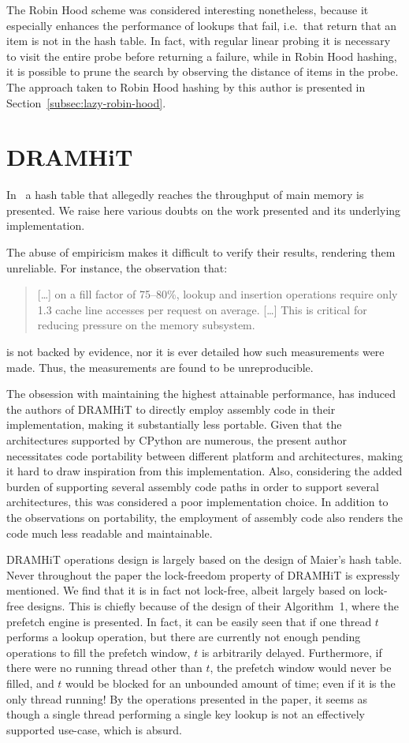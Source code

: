 The Robin Hood scheme was considered interesting nonetheless, because it especially enhances the performance of lookups that fail, i.e.\ that return that an item is not in the hash table.
In fact, with regular linear probing it is necessary to visit the entire probe before returning a failure, while in Robin Hood hashing, it is possible to prune the search by observing the distance of items in the probe.
The approach taken to Robin Hood hashing by this author is presented in Section~\ref{subsec:lazy-robin-hood}.


\section{DRAMHiT}\label{sec:dramhit}

In~\cite{dramhit} a hash table that allegedly reaches the throughput of main memory is presented.
We raise here various doubts on the work presented and its underlying implementation.

The abuse of empiricism makes it difficult to verify their results, rendering them unreliable.
For instance, the observation that:
\begin{quote}
	[\ldots] on a fill factor of 75--80\%, lookup and insertion operations require only 1.3 cache line accesses per request on average.
	[\ldots] This is critical for reducing pressure on the memory subsystem.
\end{quote}
is not backed by evidence, nor it is ever detailed how such measurements were made.
Thus, the measurements are found to be unreproducible.

The obsession with maintaining the highest attainable performance, has induced the authors of DRAMHiT to directly employ assembly code in their implementation, making it substantially less portable.
Given that the architectures supported by CPython are numerous, the present author necessitates code portability between different platform and architectures, making it hard to draw inspiration from this implementation.
Also, considering the added burden of supporting several assembly code paths in order to support several architectures, this was considered a poor implementation choice.
In addition to the observations on portability, the employment of assembly code also renders the code much less readable and maintainable.

DRAMHiT operations design is largely based on the design of Maier's hash table.
Never throughout the paper the lock-freedom property of DRAMHiT is expressly mentioned.
We find that it is in fact not lock-free, albeit largely based on lock-free designs.
This is chiefly because of the design of their Algorithm~1, where the prefetch engine is presented.
In fact, it can be easily seen that if one thread $t$ performs a lookup operation, but there are currently not enough pending operations to fill the prefetch window, $t$ is arbitrarily delayed.
Furthermore, if there were no running thread other than $t$, the prefetch window would never be filled, and $t$ would be blocked for an unbounded amount of time; even if it is the only thread running!
By the operations presented in the paper, it seems as though a single thread performing a single key lookup is not an effectively supported use-case, which is absurd.

